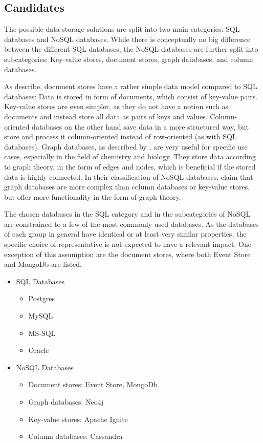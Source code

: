 \subsection{Candidates}

The possible data storage solutions are split into two main categories: \ac{SQL} databases and \ac{NoSQL} databases.
While there is conceptually no big difference between the different \ac{SQL} databases, the \ac{NoSQL} databases are further split into subcategories: Key-value stores, document stores, graph databases, and column databases.

As \citet{strauch2011nosql} describe, document stores have a rather simple data model compared to \ac{SQL} databases:
Data is stored in form of documents, which consist of key-value pairs.
Key-value stores are even simpler, as they do not have a notion such as documents and instead store all data as pairs of keys and values.
Column-oriented databases on the other hand save data in a more structured way, but store and process it column-oriented instead of row-oriented (as with \ac{SQL} databases).
Graph databases, as described by \citet{miller2013graph}, are very useful for specific use cases, especially in the field of chemistry and biology.
They store data according to graph theory, in the form of edges and nodes, which is beneficial if the stored data is highly connected.
In their classification of \ac{NoSQL} databases, \citet{popescu2010nosql} claim that graph databases are more complex than column databases or key-value stores, but offer more functionality in the form of graph theory.

The chosen databases in the \ac{SQL} category and in the subcategories of \ac{NoSQL} are constrained to a few of the most commonly used databases.
As the databases of each group in general have identical or at least very similar properties, the specific choice of representative is not expected to have a relevant impact.
One exception of this assumption are the document stores, where both Event Store and MongoDb are listed.

\begin{itemize}[noitemsep]
\item \ac{SQL} Databases
\begin{itemize}[noitemsep]
\item Postgres
\item MySQL
\item MS-SQL
\item Oracle
\end{itemize}
\item NoSQL Databases
\begin{itemize}[noitemsep]
\item Document stores: Event Store, MongoDb
\item Graph databases: Neo4j
\item Key-value stores: Apache Ignite
\item Column databases: Cassandra
\end{itemize}
\end{itemize}

